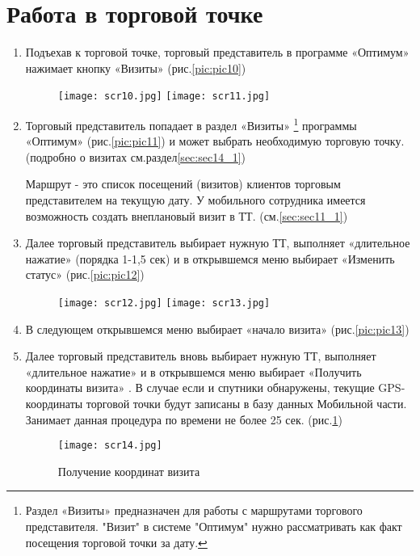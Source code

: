 \section{Работа в торговой точке}
\begin{enumerate}[\thesection .1]
\item Подъехав к торговой точке, торговый представитель в программе «Оптимум» нажимает кнопку «Визиты» 
(рис.\ref{pic:pic10})

\begin{figure}[!h]
	\begin{floatrow}
		{\texttt{[image: scr10.jpg]}}
		{\texttt{[image: scr11.jpg]}}         
	\end{floatrow}
\end{figure}
\item Торговый представитель попадает в раздел «Визиты»
\footnote{Раздел «Визиты» предназначен для работы с маршрутами торгового представителя. "Визит" в системе "Оптимум" нужно рассматривать как факт посещения торговой точки за дату.} программы «Оптимум»
(рис.\ref{pic:pic11}) и может выбрать необходимую торговую точку.
(подробно о визитах см.раздел\ref{sec:sec14_1})

Маршрут - это список посещений (визитов) клиентов торговым представителем на текущую дату. У мобильного сотрудника имеется возможность создать внеплановый визит в ТТ.
(см.\ref{sec:sec11_1})

\item Далее торговый представитель выбирает нужную ТТ, выполняет  «длительное нажатие»  (порядка 1-1,5 сек) и в открывшемся меню выбирает «Изменить статус»\label{it:it1}
(рис.\ref{pic:pic12})
\begin{figure}[!h]
\begin{floatrow}
	\ffigbox{\caption{Изменение статуса}\label{pic:pic12}}%
	{\texttt{[image: scr12.jpg]}}
	\ffigbox{\caption{Начало визита}\label{pic:pic13}}%
	{\texttt{[image: scr13.jpg]}}         
\end{floatrow}
\end{figure}
\item В следующем открывшемся меню выбирает «начало визита»\label{it:it2} 
(рис.\ref{pic:pic13})
\item Далее торговый представитель вновь выбирает нужную ТТ, выполняет  «длительное нажатие»  и в открывшемся меню выбирает «Получить координаты визита» . В случае если  и спутники обнаружены, текущие GPS-координаты торговой точки будут записаны в базу данных Мобильной части. Занимает данная процедура по времени не более 25 сек.\label{it:it3}
(рис.\ref{pic:pic14})
\begin{figure}[!h]
	\texttt{[image: scr14.jpg]} 
	\caption{Получение координат визита}\label{pic:pic14}
\end{figure}


\end{enumerate}
